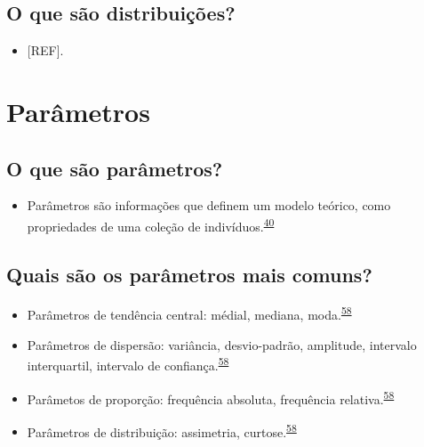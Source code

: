 \documentclass[
]{book}
\providecommand{\tightlist}{%
  \setlength{\itemsep}{0pt}\setlength{\parskip}{0pt}}
\begin{document}
\hypertarget{o-que-suxe3o-distribuiuxe7uxf5es}{%
\subsection{O que são distribuições?}\label{o-que-suxe3o-distribuiuxe7uxf5es}}

\begin{itemize}
\tightlist
\item
  {[}REF{]}.
\end{itemize}

\hypertarget{parametros}{%
\section{Parâmetros}\label{parametros}}

\hypertarget{o-que-suxe3o-paruxe2metros}{%
\subsection{O que são parâmetros?}\label{o-que-suxe3o-paruxe2metros}}

\begin{itemize}
\tightlist
\item
  Parâmetros são informações que definem um modelo teórico, como propriedades de uma coleção de indivíduos.\textsuperscript{\protect\hyperlink{ref-Altman1999}{40}}
\end{itemize}

\hypertarget{quais-suxe3o-os-paruxe2metros-mais-comuns}{%
\subsection{Quais são os parâmetros mais comuns?}\label{quais-suxe3o-os-paruxe2metros-mais-comuns}}

\begin{itemize}
\item
  Parâmetros de tendência central: médial, mediana, moda.\textsuperscript{\protect\hyperlink{ref-kanji2006}{58}}
\item
  Parâmetros de dispersão: variância, desvio-padrão, amplitude, intervalo interquartil, intervalo de confiança.\textsuperscript{\protect\hyperlink{ref-kanji2006}{58}}
\item
  Parâmetos de proporção: frequência absoluta, frequência relativa.\textsuperscript{\protect\hyperlink{ref-kanji2006}{58}}
\item
  Parâmetros de distribuição: assimetria, curtose.\textsuperscript{\protect\hyperlink{ref-kanji2006}{58}}
\end{itemize}
\end{document}
